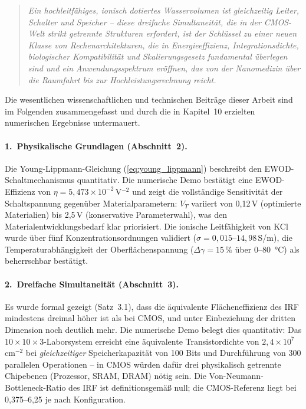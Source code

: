 ﻿\documentclass[a4paper,12pt]{scrreprt}
\theoremstyle{definition}
\begin{document}
\begin{quote}
	\emph{Ein hochleitfähiges, ionisch dotiertes Wasservolumen ist
		gleichzeitig Leiter, Schalter und Speicher -- diese dreifache
		Simultaneität, die in der CMOS-Welt strikt getrennte Strukturen
		erfordert, ist der Schlüssel zu einer neuen Klasse von
		Rechenarchitekturen, die in Energieeffizienz, Integrationsdichte,
		biologischer Kompatibilität und Skalierungsgesetz fundamental
		überlegen sind und ein Anwendungsspektrum eröffnen, das von der
		Nanomedizin über die Raumfahrt bis zur Hochleistungsrechnung reicht.}
\end{quote}

Die wesentlichen wissenschaftlichen und technischen Beiträge dieser
Arbeit sind im Folgenden zusammengefasst und durch die in Kapitel~10
erzielten numerischen Ergebnisse untermauert.

\paragraph{1.~Physikalische Grundlagen (Abschnitt~2).}
Die Young-Lippmann-Gleichung (\ref{eq:young_lippmann}) beschreibt
den EWOD-Schaltmechanismus quantitativ. Die numerische Demo bestätigt
eine EWOD-Effizienz von $\eta = 5{,}473 \times 10^{-2}$\,V$^{-2}$ und
zeigt die vollständige Sensitivität der Schaltspannung gegenüber
Materialparametern: $V_T$ variiert von 0,12\,V (optimierte Materialien)
bis 2,5\,V (konservative Parameterwahl), was den
Materialentwicklungsbedarf klar priorisiert. Die ionische
Leitfähigkeit von KCl wurde über fünf Konzentrationsordnungen validiert
($\sigma = 0{,}015$--$14{,}98$\,S/m), die Temperaturabhängigkeit der
Oberflächenspannung ($\Delta\gamma = 15\,\%$ über 0--80\, °C) als
beherrschbar bestätigt.

\paragraph{2.~Dreifache Simultaneität (Abschnitt~3).}
Es wurde formal gezeigt (Satz~3.1), dass die äquivalente Flächeneffizienz
des IRF mindestens dreimal höher ist als bei CMOS, und unter
Einbeziehung der dritten Dimension noch deutlich mehr. Die numerische
Demo belegt dies quantitativ: Das $10 \times 10 \times 3$-Laborsystem
erreicht eine äquivalente Transistordichte von $2{,}4 \times 10^7$\,cm$^{-2}$
bei \emph{gleichzeitiger} Speicherkapazität von 100 Bits und
Durchführung von 300 parallelen Operationen -- in CMOS würden dafür
drei physikalisch getrennte Chipebenen (Prozessor, SRAM, DRAM) nötig
sein. Die Von-Neumann-Bottleneck-Ratio des IRF ist definitionsgemäß
null; die CMOS-Referenz liegt bei 0,375--6,25 je nach Konfiguration.
\end{document}

